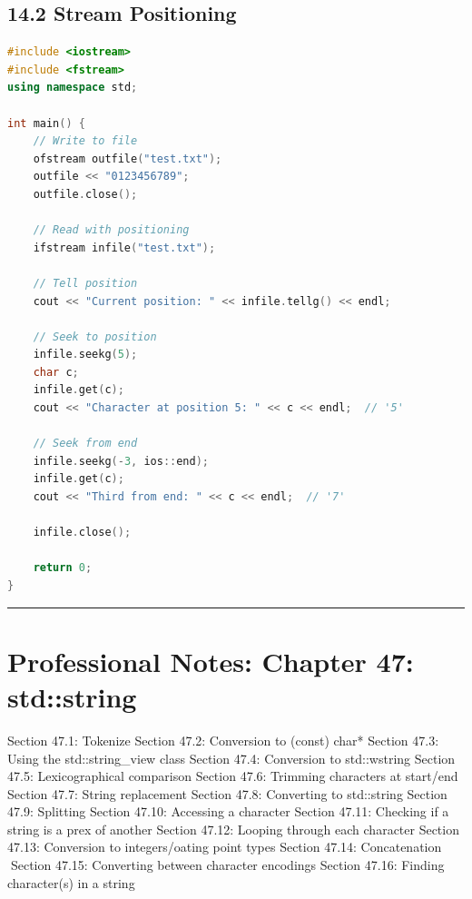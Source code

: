 \hypertarget{stream-positioning}{%
\section{14.2 Stream Positioning}\label{stream-positioning}}

\begin{lstlisting}[language={C++}]
#include <iostream>
#include <fstream>
using namespace std;

int main() {
    // Write to file
    ofstream outfile("test.txt");
    outfile << "0123456789";
    outfile.close();
    
    // Read with positioning
    ifstream infile("test.txt");
    
    // Tell position
    cout << "Current position: " << infile.tellg() << endl;
    
    // Seek to position
    infile.seekg(5);
    char c;
    infile.get(c);
    cout << "Character at position 5: " << c << endl;  // '5'
    
    // Seek from end
    infile.seekg(-3, ios::end);
    infile.get(c);
    cout << "Third from end: " << c << endl;  // '7'
    
    infile.close();
    
    return 0;
}
\end{lstlisting}

\begin{center}\rule{0.5\linewidth}{0.5pt}\end{center}

\hypertarget{professional-notes-chapter-47-stdstring}{%
\chapter{Professional Notes: Chapter 47:
std::string}\label{professional-notes-chapter-47-stdstring}}

Section 47.1: Tokenize Section 47.2: Conversion to (const) char* Section
47.3: Using the std::string\_view class Section 47.4: Conversion to
std::wstring Section 47.5: Lexicographical comparison Section 47.6:
Trimming characters at start/end Section 47.7: String replacement
Section 47.8: Converting to std::string Section 47.9: Splitting Section
47.10: Accessing a character Section 47.11: Checking if a string is a
prex of another Section 47.12: Looping through each character Section
47.13: Conversion to integers/oating point types Section 47.14:
Concatenation Section 47.15: Converting between character encodings
Section 47.16: Finding character(s) in a string

